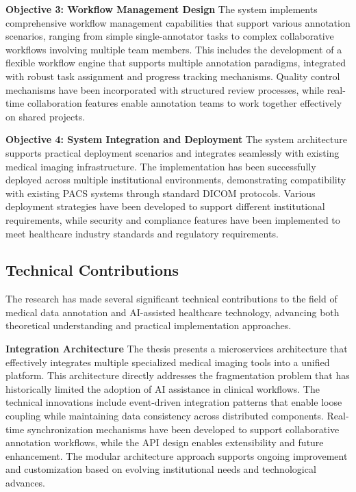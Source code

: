 \textbf{Objective 3: Workflow Management Design}
The system implements comprehensive workflow management capabilities that support various annotation scenarios, ranging from simple single-annotator tasks to complex collaborative workflows involving multiple team members. This includes the development of a flexible workflow engine that supports multiple annotation paradigms, integrated with robust task assignment and progress tracking mechanisms. Quality control mechanisms have been incorporated with structured review processes, while real-time collaboration features enable annotation teams to work together effectively on shared projects.

\textbf{Objective 4: System Integration and Deployment}
The system architecture supports practical deployment scenarios and integrates seamlessly with existing medical imaging infrastructure. The implementation has been successfully deployed across multiple institutional environments, demonstrating compatibility with existing PACS systems through standard DICOM protocols. Various deployment strategies have been developed to support different institutional requirements, while security and compliance features have been implemented to meet healthcare industry standards and regulatory requirements.

\subsection{Technical Contributions}

The research has made several significant technical contributions to the field of medical data annotation and AI-assisted healthcare technology, advancing both theoretical understanding and practical implementation approaches.

\textbf{Integration Architecture}
The thesis presents a microservices architecture that effectively integrates multiple specialized medical imaging tools into a unified platform. This architecture directly addresses the fragmentation problem that has historically limited the adoption of AI assistance in clinical workflows. The technical innovations include event-driven integration patterns that enable loose coupling while maintaining data consistency across distributed components. Real-time synchronization mechanisms have been developed to support collaborative annotation workflows, while the API design enables extensibility and future enhancement. The modular architecture approach supports ongoing improvement and customization based on evolving institutional needs and technological advances.

